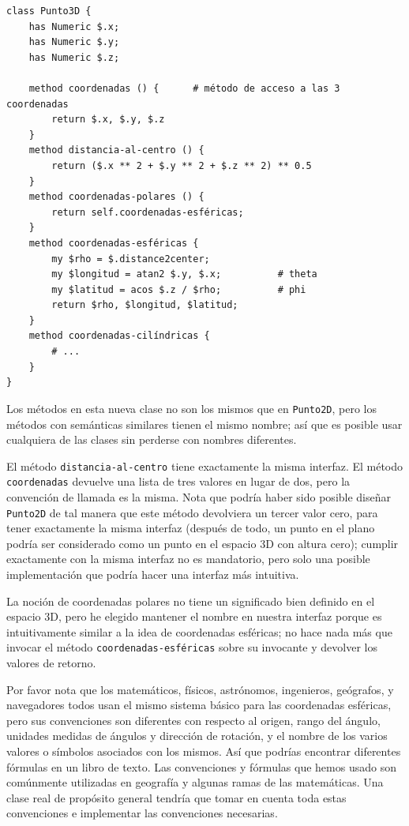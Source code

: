 \begin{lstlisting}
class Punto3D {
    has Numeric $.x;
    has Numeric $.y;
    has Numeric $.z;
    
    method coordenadas () {      # método de acceso a las 3 coordenadas
    	return $.x, $.y, $.z
    }
    method distancia-al-centro () {
        return ($.x ** 2 + $.y ** 2 + $.z ** 2) ** 0.5
    }
    method coordenadas-polares () {
    	return self.coordenadas-esféricas;
    }
    method coordenadas-esféricas {
    	my $rho = $.distance2center;
    	my $longitud = atan2 $.y, $.x;          # theta
    	my $latitud = acos $.z / $rho;          # phi 
    	return $rho, $longitud, $latitud;
    }
    method coordenadas-cilíndricas {
    	# ...
    }
}
\end{lstlisting}

Los métodos en esta nueva clase no son los mismos que 
en {\tt Punto2D}, pero los métodos con semánticas similares
tienen el mismo nombre; así que es posible usar cualquiera
de las clases sin perderse con nombres diferentes.

El método {\tt distancia-al-centro} tiene exactamente la misma interfaz. El método {\tt coordenadas} devuelve una lista de tres 
valores en lugar de dos, pero la convención de llamada es la misma. Nota que podría haber sido posible diseñar {\tt Punto2D}
de tal manera que este método devolviera un tercer valor cero, 
para tener exactamente la misma interfaz (después de todo, un punto en el plano podría ser considerado como un punto en el 
espacio 3D con altura cero); cumplir exactamente con la misma
interfaz no es mandatorio, pero solo una posible implementación
que podría hacer una interfaz más intuitiva.
 

La noción de coordenadas polares no tiene un significado 
bien definido en el espacio 3D, pero he elegido mantener el nombre
en nuestra interfaz porque es intuitivamente similar a la idea
de coordenadas esféricas; no hace nada más que invocar 
el método \verb|coordenadas-esféricas| sobre su invocante y
devolver los valores de retorno.

Por favor nota que los matemáticos, físicos, astrónomos, ingenieros, geógrafos, y navegadores todos usan el mismo sistema
básico para las coordenadas esféricas, pero sus convenciones
son diferentes con respecto al origen, rango del ángulo, 
unidades medidas de ángulos y dirección de rotación, y el nombre de los varios valores o símbolos asociados con los mismos. 
Así que podrías encontrar diferentes fórmulas en un libro de
texto. Las convenciones y fórmulas que hemos usado son comúnmente
utilizadas en geografía y algunas ramas de las matemáticas. Una clase real de propósito general tendría que tomar en cuenta toda estas convenciones e implementar las convenciones necesarias.


